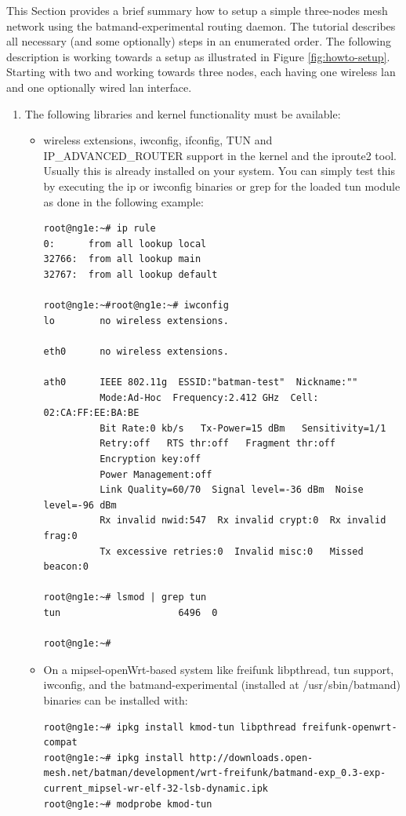 \documentclass[11pt]{article}
\begin{document}
This Section provides a brief summary how to setup a simple three-nodes mesh network using the batmand-experimental routing daemon. 
%
The tutorial describes all necessary (and some optionally) steps in an enumerated order. 
%
The following description is working towards a setup as illustrated in Figure \ref{fig:howto-setup}.
Starting with two and working towards three nodes, each having one wireless lan and one optionally wired lan interface.
\begin{enumerate}

\item The following libraries and kernel functionality must be available:

\begin{itemize}
 \item wireless extensions, iwconfig, ifconfig, TUN and IP\_ADVANCED\_ROUTER support in the kernel and the iproute2 tool. Usually this is already installed on your system. You can simply test this by executing the ip or iwconfig binaries or grep for the loaded tun module as done in the following example:
%
\begin{small} \begin{verbatim}
root@ng1e:~# ip rule
0:      from all lookup local
32766:  from all lookup main
32767:  from all lookup default

root@ng1e:~#root@ng1e:~# iwconfig
lo        no wireless extensions.

eth0      no wireless extensions.

ath0      IEEE 802.11g  ESSID:"batman-test"  Nickname:""
          Mode:Ad-Hoc  Frequency:2.412 GHz  Cell: 02:CA:FF:EE:BA:BE
          Bit Rate:0 kb/s   Tx-Power=15 dBm   Sensitivity=1/1
          Retry:off   RTS thr:off   Fragment thr:off
          Encryption key:off
          Power Management:off
          Link Quality=60/70  Signal level=-36 dBm  Noise level=-96 dBm
          Rx invalid nwid:547  Rx invalid crypt:0  Rx invalid frag:0
          Tx excessive retries:0  Invalid misc:0   Missed beacon:0

root@ng1e:~# lsmod | grep tun
tun                     6496  0

root@ng1e:~#
\end{verbatim} \end{small} 

\item On a mipsel-openWrt-based system like freifunk libpthread, tun support, iwconfig, and the batmand-experimental (installed at /usr/sbin/batmand) binaries can be installed with:
%
\begin{tiny}  \begin{verbatim}
root@ng1e:~# ipkg install kmod-tun libpthread freifunk-openwrt-compat
root@ng1e:~# ipkg install http://downloads.open-mesh.net/batman/development/wrt-freifunk/batmand-exp_0.3-exp-current_mipsel-wr-elf-32-lsb-dynamic.ipk
root@ng1e:~# modprobe kmod-tun
\end{verbatim} \end{tiny} 


\end{itemize}
\end{enumerate}
\end{document}
